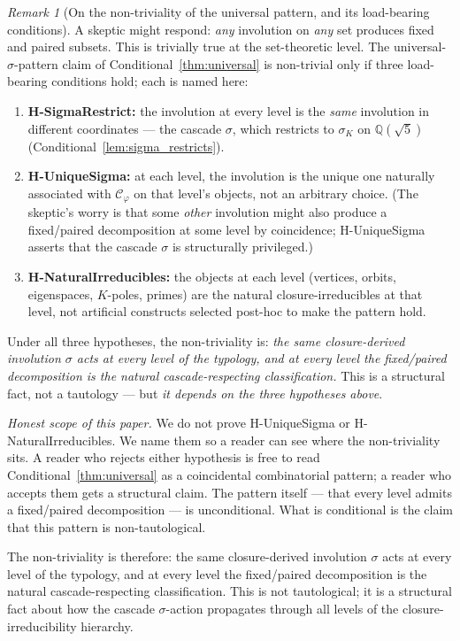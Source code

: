 \documentclass[11pt,a4paper]{article}
\theoremstyle{definition}
\theoremstyle{remark}
\newtheorem{remark}[theorem]{Remark}
\begin{document}
\begin{remark}[On the non-triviality of the universal pattern, and its load-bearing conditions]
A skeptic might respond: \emph{any} involution on \emph{any} set produces
fixed and paired subsets. This is trivially true at the set-theoretic
level. The universal-$\sigma$-pattern claim of
Conditional~\ref{thm:universal} is non-trivial only if three load-bearing
conditions hold; each is named here:
\begin{enumerate}\itemsep0pt
  \item \textbf{H-SigmaRestrict:} the involution at every level is the
    \emph{same} involution in different coordinates --- the cascade
    $\sigma$, which restricts to $\sigma_K$ on $\mathbb{Q}(\sqrt{5})$
    (Conditional~\ref{lem:sigma_restricts}).
  \item \textbf{H-UniqueSigma:} at each level, the involution is the
    unique one naturally associated with $\mathcal{C}_\varphi$ on that
    level's objects, not an arbitrary choice. (The skeptic's worry is
    that some \emph{other} involution might also produce a fixed/paired
    decomposition at some level by coincidence; H-UniqueSigma asserts
    that the cascade $\sigma$ is structurally privileged.)
  \item \textbf{H-NaturalIrreducibles:} the objects at each level
    (vertices, orbits, eigenspaces, $K$-poles, primes) are the natural
    closure-irreducibles at that level, not artificial constructs
    selected post-hoc to make the pattern hold.
\end{enumerate}
Under all three hypotheses, the non-triviality is: \emph{the same
closure-derived involution $\sigma$ acts at every level of the typology,
and at every level the fixed/paired decomposition is the natural
cascade-respecting classification.} This is a structural fact, not a
tautology --- but \emph{it depends on the three hypotheses above}.

\smallskip\noindent\emph{Honest scope of this paper.} We do not prove
H-UniqueSigma or H-NaturalIrreducibles. We name them so a reader can see
where the non-triviality sits. A reader who rejects either hypothesis is
free to read Conditional~\ref{thm:universal} as a coincidental
combinatorial pattern; a reader who accepts them gets a structural
claim. The pattern itself --- that every level admits a fixed/paired
decomposition --- is unconditional. What is conditional is the claim
that this pattern is non-tautological.

The non-triviality is therefore: the same closure-derived involution
$\sigma$ acts at every level of the typology, and at every level the
fixed/paired decomposition is the natural cascade-respecting
classification. This is not tautological; it is a structural fact about
how the cascade $\sigma$-action propagates through all levels of the
closure-irreducibility hierarchy.
\end{remark}
\end{document}
